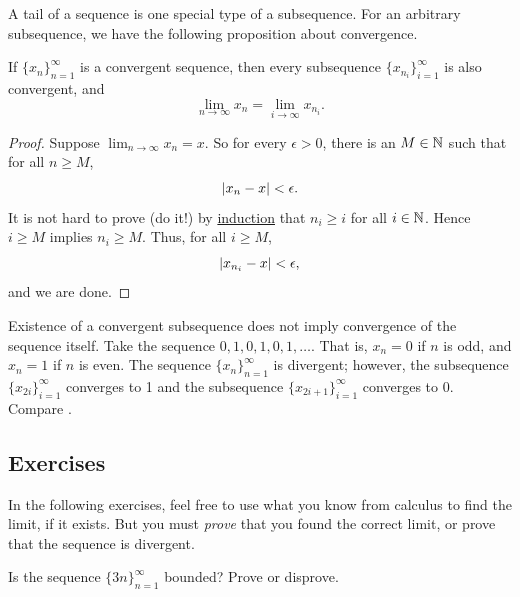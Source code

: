 A tail of a sequence is one special type of a subsequence.  For an arbitrary
subsequence, we have the following proposition about convergence.

\begin{prop} \label{prop:seqtosubseq}
If $\{ x_n \}_{n=1}^\infty$ is a convergent sequence,
then every subsequence $\{ x_{n_i} \}_{i=1}^\infty$ is also convergent, and
\begin{equation*}
\lim_{n\to \infty} x_n = 
\lim_{i\to \infty} x_{n_i} .
\end{equation*}
\end{prop}

\begin{proof}
Suppose $\lim_{n\to \infty} x_n = x$.  So for every
$\epsilon > 0$, there is an $M \in {\mathbb{N}}$ such that for all $n \geq M$,
\begin{equation*}
\left\lvert {x_n - x} \right\rvert < \epsilon .
\end{equation*}
It is not hard to prove (do it!) by \hyperref[induction:thm]{induction} that
$n_i \geq i$ for all $i \in {\mathbb{N}}$.  Hence $i \geq M$ implies $n_i \geq M$.  Thus,
for all $i \geq M$,
\begin{equation*}
\left\lvert {x_{n_i} - x} \right\rvert < \epsilon ,
\end{equation*}
and we are done.
\end{proof}

\begin{example}
Existence of a convergent subsequence does not imply
convergence of the sequence itself.
Take the sequence $0,1,0,1,0,1,\ldots$.  That is,
$x_n = 0$ if $n$ is odd, and $x_n = 1$ if $n$ is even.  The sequence
$\{ x_n \}_{n=1}^\infty$ is divergent; however, the subsequence
$\{ x_{2i} \}_{i=1}^\infty$ converges to 1 and the subsequence
$\{ x_{2i+1} \}_{i=1}^\infty$ converges to 0.  Compare .
\end{example}

\subsection{Exercises}

\begin{exnote}
In the following exercises, feel free to use what you know from calculus to
find the limit, if it exists.  But you must \emph{prove}
that you
found the correct limit, or prove that the sequence is divergent.
\end{exnote}

\begin{exercise}
Is the sequence
$\{ 3n \}_{n=1}^\infty$
bounded?  Prove or disprove.
\end{exercise}

